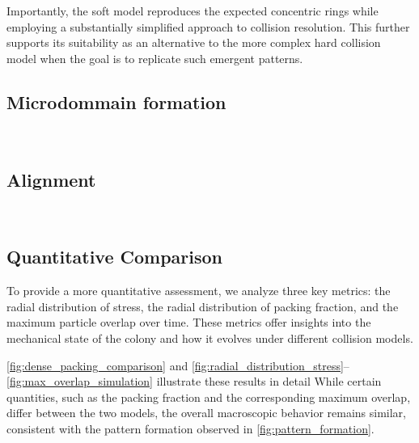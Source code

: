 \documentclass[conference]{IEEEtran}
\begin{document}
Importantly, the soft model reproduces the expected concentric rings while employing a substantially simplified approach to collision resolution. This further supports its suitability as an alternative to the more complex hard collision model when the goal is to replicate such emergent patterns.



\subsection{Microdommain formation}

~\cite{You2018}


\subsection{Alignment}

~\cite{You_2021}


\subsection{Quantitative Comparison}

To provide a more quantitative assessment, we analyze three key metrics: the radial distribution of stress, the radial distribution of packing fraction, and the maximum particle overlap over time. These metrics offer insights into the mechanical state of the colony and how it evolves under different collision models.

\autoref{fig:dense_packing_comparison} and \autoref{fig:radial_distribution_stress}--\autoref{fig:max_overlap_simulation} illustrate these results in detail While certain quantities, such as the packing fraction and the corresponding maximum overlap, differ between the two models, the overall macroscopic behavior remains similar, consistent with the pattern formation observed in \autoref{fig:pattern_formation}.
\end{document}
